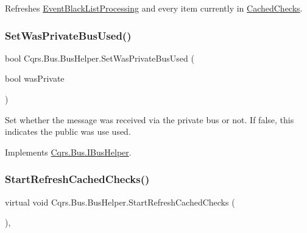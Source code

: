 Refreshes \hyperlink{classCqrs_1_1Bus_1_1BusHelper_ae8d3525369ee9572de06f935cc09510b_ae8d3525369ee9572de06f935cc09510b}{Event\+Black\+List\+Processing} and every item currently in \hyperlink{classCqrs_1_1Bus_1_1BusHelper_ae29e80bd315b6284509c9fd0b977d2a0_ae29e80bd315b6284509c9fd0b977d2a0}{Cached\+Checks}. 

\mbox{\label{classCqrs_1_1Bus_1_1BusHelper_ae243200364c620a2719b7be62d74eb7e_ae243200364c620a2719b7be62d74eb7e}} 
\subsubsection{\texorpdfstring{Set\+Was\+Private\+Bus\+Used()}{SetWasPrivateBusUsed()}}
{\footnotesize\ttfamily bool Cqrs.\+Bus.\+Bus\+Helper.\+Set\+Was\+Private\+Bus\+Used (\begin{DoxyParamCaption}\item[{bool}]{was\+Private }\end{DoxyParamCaption})}



Set whether the message was received via the private bus or not. If false, this indicates the public was use used. 



Implements \hyperlink{interfaceCqrs_1_1Bus_1_1IBusHelper_a40a395ea6d92a6162c8e584a39284bbc_a40a395ea6d92a6162c8e584a39284bbc}{Cqrs.\+Bus.\+I\+Bus\+Helper}.

\mbox{\label{classCqrs_1_1Bus_1_1BusHelper_a23bfab1be70af651cc48033fcdf4ce2c_a23bfab1be70af651cc48033fcdf4ce2c}} 
\subsubsection{\texorpdfstring{Start\+Refresh\+Cached\+Checks()}{StartRefreshCachedChecks()}}
{\footnotesize\ttfamily virtual void Cqrs.\+Bus.\+Bus\+Helper.\+Start\+Refresh\+Cached\+Checks (\begin{DoxyParamCaption}{ }\end{DoxyParamCaption})\hspace{0.3cm}{\ttfamily [protected]}, {\ttfamily [virtual]}}




